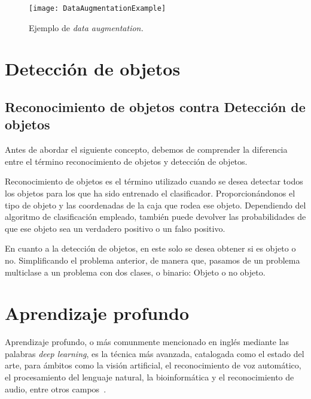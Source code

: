 \begin{figure}
\centering
\texttt{[image: DataAugmentationExample]}
\caption{Ejemplo de \textit{data augmentation.}}
\label{fig:3.4.1}
\end{figure}

\section{Detección de objetos}

\subsection{Reconocimiento de objetos contra Detección de objetos}

Antes de abordar el siguiente concepto, debemos de comprender la diferencia entre el término reconocimiento de objetos y detección de objetos.

Reconocimiento de objetos es el término utilizado cuando se desea detectar todos los objetos para los que ha sido entrenado el clasificador. Proporcionándonos el tipo de objeto y las coordenadas de la caja que rodea ese objeto. Dependiendo del algoritmo de clasificación empleado, también puede devolver las probabilidades de que ese objeto sea un verdadero positivo o un falso positivo.

En cuanto a la detección de objetos, en este solo se desea obtener si es objeto o no. Simplificando el problema anterior, de manera que, pasamos de un problema multiclase a un problema con dos clases, o binario: Objeto o no objeto.



\section{Aprendizaje profundo}

Aprendizaje profundo, o más comunmente mencionado en inglés mediante las palabras \textit{deep learning}, es la técnica más avanzada, catalogada como el estado del arte, para ámbitos como la visión artificial, el reconocimiento de voz automático, el procesamiento del lenguaje natural,  la bioinformática y el reconocimiento de audio, entre otros campos~\cite{ms:deeplearning}.

